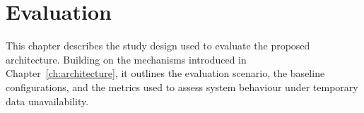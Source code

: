 \chapter{Evaluation}\label{ch:evaluation}

This chapter describes the study design used to evaluate the proposed architecture. Building on the mechanisms introduced in Chapter~\ref{ch:architecture}, it outlines the evaluation scenario, the baseline configurations, and the metrics used to assess system behaviour under temporary data unavailability.